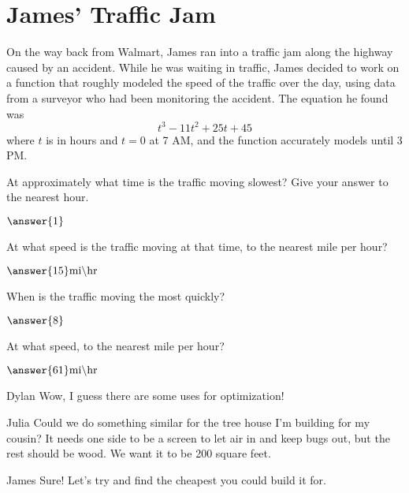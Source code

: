 \documentclass{ximera}
\begin{document}
\section{James' Traffic Jam}
On the way back from Walmart, James ran into a traffic jam along the highway caused by an accident. While he was waiting in traffic, James decided to work on a function that roughly modeled the speed of the traffic over the day, using data from a surveyor who had been monitoring the accident. The equation he found was $$t^3-11t^2+25t+45$$ where $t$ is in hours and $t = 0$ at 7 AM, and the function accurately models until 3 PM.
\begin{question}

At approximately what time is the traffic moving slowest? Give your answer to the nearest hour.

$\answer{1}$ \begin{multipleChoice}
\end{multipleChoice}

At what speed is the traffic moving at that time, to the nearest mile per hour?

$\answer{15} \text{mi} \backslash \text{hr}$
\end{question}
\begin{question}

When is the traffic moving the most quickly?

$\answer{8}$\begin{multipleChoice}
\end{multipleChoice}

At what speed, to the nearest mile per hour?

$\answer{61} \text{mi} \backslash \text{hr}$

\end{question}
\begin{dialogue}
\item[Dylan] Wow, I guess there are some uses for optimization!
\item[Julia] Could we do something similar for the tree house I'm building for my cousin? It needs one side to be a screen to let air in and keep bugs out, but the rest should be wood. We want it to be 200 square feet.
\item[James] Sure! Let's try and find the cheapest you could build it for.
\end{dialogue}
\end{document}
